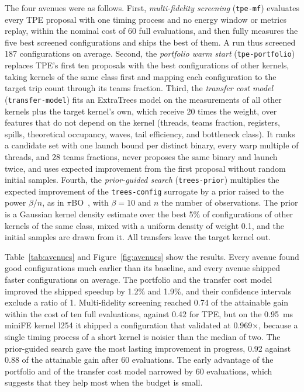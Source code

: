 \documentclass[10pt]{article}
\newcommand{\x}{\ensuremath{\times}}
\newcommand{\code}[1]{\texttt{#1}}
\begin{document}
The four avenues were as follows. First, \emph{multi-fidelity screening}
(\code{tpe-mf}) evaluates every TPE proposal with one timing process and no
energy window or metrics replay, within the nominal cost of 60 full
evaluations, and then fully measures the five best screened configurations
and ships the best of them. A run thus screened 187 configurations on
average. Second, the \emph{portfolio warm start} (\code{tpe-portfolio})
replaces TPE's first ten proposals with the best configurations of other
kernels, taking kernels of the same class first and mapping each
configuration to the target trip count through its teams fraction. Third,
the \emph{transfer cost model} (\code{transfer-model}) fits an ExtraTrees
model on the measurements of all other kernels plus the target kernel's own,
which receive 20 times the weight, over features that do not depend on the
kernel (threads, teams fraction, registers, spills, theoretical occupancy,
waves, tail efficiency, and bottleneck class). It ranks a candidate set with
one launch bound per distinct binary, every warp multiple of threads, and 28
teams fractions, never proposes the same binary and launch twice, and uses
expected improvement from the first proposal without random initial samples.
Fourth, the \emph{prior-guided search} (\code{trees-prior}) multiplies the
expected improvement of the \code{trees-config} surrogate by a prior raised to
the power $\beta/n$, as in $\pi$BO~\cite{hvarfner2022pibo}, with $\beta = 10$
and $n$ the number of observations. The prior is a Gaussian kernel density
estimate over the best 5\% of configurations of other kernels of the same
class, mixed with a uniform density of weight 0.1, and the initial samples are
drawn from it. All transfers leave the target kernel out.

Table~\ref{tab:avenues} and Figure~\ref{fig:avenues} show the results. Every
avenue found good configurations much earlier than its baseline, and every
avenue shipped faster configurations on average. The portfolio and the
transfer cost model improved the shipped speedup by 1.2\% and 1.9\%, and
their confidence intervals exclude a ratio of 1. Multi-fidelity screening
reached 0.74 of the attainable gain within the cost of ten full evaluations,
against 0.42 for TPE, but on the 0.95~ms miniFE kernel l254 it shipped a
configuration that validated at 0.969\x{}, because a single timing process
of a short kernel is noisier than the median of two. The prior-guided search
gave the most lasting improvement in progress, 0.92 against 0.88 of the
attainable gain after 60 evaluations. The early advantage of the portfolio
and of the transfer cost model narrowed by 60 evaluations, which suggests that
they help most when the budget is small.
\end{document}
